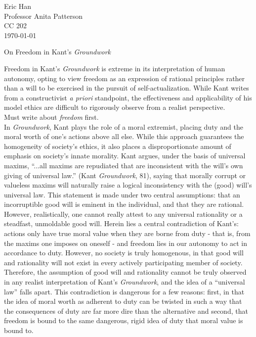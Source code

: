 \documentclass[12pt]{article}
\begin{document}
\begin{flushleft}

Eric Han\\
Professor Anita Patterson\\
CC 202\\
\today \\


\begin{center}
On Freedom in Kant's \textit{Groundwork}
\end{center}


\setlength{\parindent}{0.5in}

Freedom in Kant's \textit{Groundwork} is extreme in its interpretation of human autonomy, opting to view freedom as an expression of rational principles rather than a will to be exercised in the pursuit of self-actualization. While Kant writes from a constructivist \textit{a priori} standpoint, the effectiveness and applicability of his model ethics are difficult to rigorously observe from a realist perspective. \\
Must write about \textit{freedom} first.\\
In \textit{Groundwork}, Kant plays the role of a moral extremist, placing duty and the moral worth of one's actions above all else. While this approach guarantees the homogeneity of society's ethics, it also places a disproportionate amount of emphasis on society's innate morality. Kant argues, under the basis of universal maxims, ``...all maxims are repudiated that are inconsistent with the will's own giving of universal law.'' (Kant \textit{Groundwork}, 81), saying that morally corrupt or valueless maxims will naturally raise a logical inconsistency with the (good) will's universal law. This statement is made under two central assumptions: that an incorruptible good will is eminent in the individual, and that they are rational. However, realistically, one cannot really attest to any universal rationality or a steadfast, unmoldable good will. Herein lies a central contradiction of Kant's: actions only have true moral value when they are borne from duty - that is, from the maxims one imposes on oneself - and freedom lies in our autonomy to act in accordance to duty. However, no society is truly homogenous, in that good will and rationality will not exist in every actively participating member of society. Therefore, the assumption of good will and rationality cannot be truly observed in any realist interpretation of Kant's \textit{Groundwork}, and the idea of a ``universal law'' falls apart. This contradiction is dangerous for a few reasons: first, in that the idea of moral worth as adherent to duty can be twisted in such a way that the consequences of duty are far more dire than the alternative and second, that freedom is bound to the same dangerous, rigid idea of duty that moral value is bound to. \\

\end{flushleft}
\end{document}
